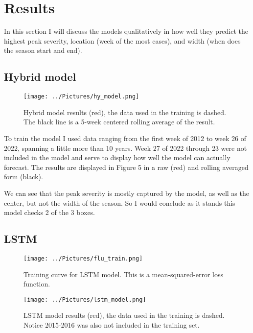 \documentclass[12pt,a4paper,english]{article}
\begin{document}
	
\section{Results}
In this section I will discuss the models qualitatively in how well they predict the highest peak severity, location (week of the most cases), and width (when does the season start and end).
\subsection{Hybrid model}

	\begin{figure}[h!]
		\begin{center}
		\texttt{[image: ../Pictures/hy\_model.png]}
		\caption{Hybrid model results (red), the data used in the training is dashed. The black line is a 5-week centered rolling average of the result.}
		\end{center}
		\label{fig:hy_model}
	\end{figure}
\FloatBarrier

To train the model I used data ranging from the first week of 2012 to week 26 of 2022, spanning a little more than 10 years. Week 27 of 2022 through 23 were not included in the model and serve to display how well the model can actually forecast. The results are displayed in Figure 5 in a raw (red) and rolling averaged form (black). 

We can see that the peak severity is mostly captured by the model, as well as the center, but not the width of the season. So I would conclude as it stands this model checks 2 of the 3 boxes. 


\subsection{LSTM}


	\begin{figure}[h!]
		\begin{center}
		\texttt{[image: ../Pictures/flu\_train.png]}
		\caption{Training curve for LSTM model. This is a mean-squared-error loss function.}
		\end{center}
		\label{fig:lstm_train}
	\end{figure}
\FloatBarrier


	\begin{figure}[h!]
		\begin{center}
		\texttt{[image: ../Pictures/lstm\_model.png]}
		\caption{LSTM model results (red), the data used in the training is dashed. Notice 2015-2016 was also not included in the training set.}
		\end{center}
		\label{fig:lstm_model}
	\end{figure}
\FloatBarrier
\end{document}
